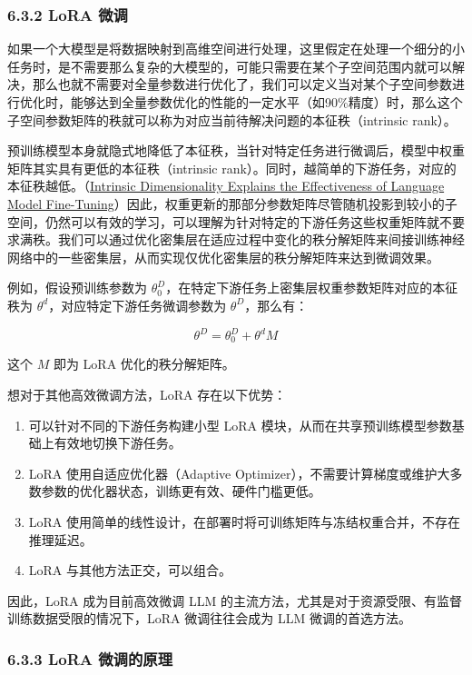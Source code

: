 \documentclass[12pt,a4paper]{book}
\begin{document}
\subsubsection{6.3.2 LoRA 微调}\label{lora-ux5faeux8c03}

如果一个大模型是将数据映射到高维空间进行处理，这里假定在处理一个细分的小任务时，是不需要那么复杂的大模型的，可能只需要在某个子空间范围内就可以解决，那么也就不需要对全量参数进行优化了，我们可以定义当对某个子空间参数进行优化时，能够达到全量参数优化的性能的一定水平（如90\%精度）时，那么这个子空间参数矩阵的秩就可以称为对应当前待解决问题的本征秩（intrinsic
rank）。

预训练模型本身就隐式地降低了本征秩，当针对特定任务进行微调后，模型中权重矩阵其实具有更低的本征秩（intrinsic
rank）。同时，越简单的下游任务，对应的本征秩越低。（\href{https://arxiv.org/abs/2012.13255}{Intrinsic
Dimensionality Explains the Effectiveness of Language Model
Fine-Tuning}）因此，权重更新的那部分参数矩阵尽管随机投影到较小的子空间，仍然可以有效的学习，可以理解为针对特定的下游任务这些权重矩阵就不要求满秩。我们可以通过优化密集层在适应过程中变化的秩分解矩阵来间接训练神经网络中的一些密集层，从而实现仅优化密集层的秩分解矩阵来达到微调效果。

例如，假设预训练参数为
\(\theta^D_0\)，在特定下游任务上密集层权重参数矩阵对应的本征秩为
\(\theta^d\)，对应特定下游任务微调参数为 \(\theta^D\)，那么有：

\[\theta^D = \theta^D_0 + \theta^d M\]

这个 \(M\) 即为 LoRA 优化的秩分解矩阵。

想对于其他高效微调方法，LoRA 存在以下优势：

\begin{enumerate}
\def\labelenumi{\arabic{enumi}.}
\tightlist
\item
  可以针对不同的下游任务构建小型 LoRA
  模块，从而在共享预训练模型参数基础上有效地切换下游任务。
\item
  LoRA 使用自适应优化器（Adaptive
  Optimizer），不需要计算梯度或维护大多数参数的优化器状态，训练更有效、硬件门槛更低。
\item
  LoRA
  使用简单的线性设计，在部署时将可训练矩阵与冻结权重合并，不存在推理延迟。
\item
  LoRA 与其他方法正交，可以组合。
\end{enumerate}

因此，LoRA 成为目前高效微调 LLM
的主流方法，尤其是对于资源受限、有监督训练数据受限的情况下，LoRA
微调往往会成为 LLM 微调的首选方法。

\subsubsection{6.3.3 LoRA
微调的原理}\label{lora-ux5faeux8c03ux7684ux539fux7406}
\end{document}

